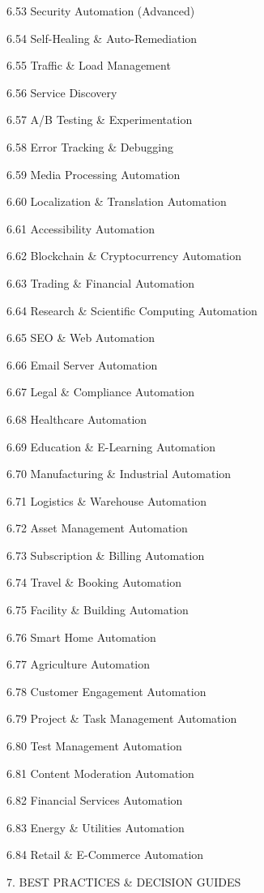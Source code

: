 \documentclass[11pt,a4paper]{article}
\begin{document}
   6.53 Security Automation (Advanced)

   6.54 Self-Healing \& Auto-Remediation

   6.55 Traffic \& Load Management

   6.56 Service Discovery

   6.57 A/B Testing \& Experimentation

   6.58 Error Tracking \& Debugging

   6.59 Media Processing Automation

   6.60 Localization \& Translation Automation

   6.61 Accessibility Automation

   6.62 Blockchain \& Cryptocurrency Automation

   6.63 Trading \& Financial Automation

   6.64 Research \& Scientific Computing Automation

   6.65 SEO \& Web Automation

   6.66 Email Server Automation

   6.67 Legal \& Compliance Automation

   6.68 Healthcare Automation

   6.69 Education \& E-Learning Automation

   6.70 Manufacturing \& Industrial Automation

   6.71 Logistics \& Warehouse Automation

   6.72 Asset Management Automation

   6.73 Subscription \& Billing Automation

   6.74 Travel \& Booking Automation

   6.75 Facility \& Building Automation

   6.76 Smart Home Automation

   6.77 Agriculture Automation

   6.78 Customer Engagement Automation

   6.79 Project \& Task Management Automation

   6.80 Test Management Automation

   6.81 Content Moderation Automation

   6.82 Financial Services Automation

   6.83 Energy \& Utilities Automation

   6.84 Retail \& E-Commerce Automation

7. BEST PRACTICES \& DECISION GUIDES
\end{document}
